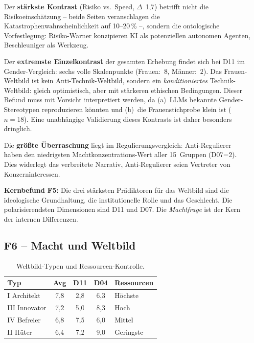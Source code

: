 \documentclass[12pt,a4paper]{article}
\begin{document}
Der \textbf{st\"arkste Kontrast} (Risiko vs.\ Speed, $\Delta$~1,7) betrifft nicht die Risikoeinsch\"atzung -- beide Seiten veranschlagen die Katastrophenwahrscheinlichkeit auf 10--20\,\% --, sondern die ontologische Vorfestlegung: Risiko-Warner konzipieren KI als potenziellen autonomen Agenten, Beschleuniger als Werkzeug.

Der \textbf{extremste Einzelkontrast} der gesamten Erhebung findet sich bei D11 im Gender-Vergleich: sechs volle Skalenpunkte (Frauen:~8, M\"anner:~2). Das Frauen-Weltbild ist kein Anti-Technik-Weltbild, sondern ein \emph{konditioniertes} Technik-Weltbild: gleich optimistisch, aber mit st\"arkeren ethischen Bedingungen. Dieser Befund muss mit Vorsicht interpretiert werden, da (a)~LLMs bekannte Gender-Stereotypen reproduzieren k\"onnten und (b)~die Frauenstichprobe klein ist ($n = 18$). Eine unabh\"angige Validierung dieses Kontrasts ist daher besonders dringlich.

Die \textbf{gr\"o\ss{}te \"Uberraschung} liegt im Regulierungsvergleich: Anti-Regulierer haben den niedrigsten Machtkonzentrations-Wert aller 15~Gruppen (D07=2). Dies widerlegt das verbreitete Narrativ, Anti-Regulierer seien Vertreter von Konzerninteressen.

\medskip
\noindent\textbf{Kernbefund F5:} Die drei st\"arksten Pr\"adiktoren f\"ur das Weltbild sind die ideologische Grundhaltung, die institutionelle Rolle und das Geschlecht. Die polarisierendsten Dimensionen sind D11 und D07. Die \emph{Machtfrage} ist der Kern der internen Differenzen.


\subsection{F6 -- Macht und Weltbild}
\label{sec:ergebnisse:f6}

\begin{table}[htbp]
  \centering
  \caption{Weltbild-Typen und Ressourcen-Kontrolle.}
  \label{tab:macht}
  \begin{tabular}{l c c c l}
    \toprule
    \textbf{Typ} & \textbf{Avg} & \textbf{D11} & \textbf{D04} & \textbf{Ressourcen} \\
    \midrule
    I Architekt  & 7,8 & 2,8 & 6,3 & H\"ochste \\
    III Innovator & 7,2 & 5,0 & 8,3 & Hoch \\
    IV Befreier  & 6,8 & 7,5 & 6,0 & Mittel \\
    II H\"uter   & 6,4 & 7,2 & 9,0 & Geringste \\
    \bottomrule
  \end{tabular}
\end{table}
\end{document}
